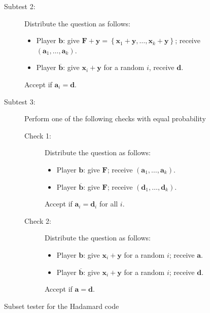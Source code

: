 \documentclass[10pt,a4paper]{article}
\theoremstyle{plain}
\theoremstyle{definition}
\newcommand {\set} [1] {\ensuremath{ \left\lbrace #1 \right\rbrace }}
\newenvironment{Algorithm}{\begin{framed}}{\end{framed}}
\newcommand{\1}{\mathbb{1}} %
\newcommand{\ba}{\pmb{a}}
\newcommand{\bb}{\pmb{b}}
\newcommand{\bd}{\pmb{d}}
\newcommand{\bx}{\pmb{x}}
\newcommand{\by}{\pmb{y}}
\newcommand{\pmbF}{\pmb{F}}
\begin{document}
\begin{figure}
\begin{Algorithm}
\begin{description}
    \item[Subtest 2:]
    Distribute the question as follows:
        \begin{itemize}
            \item Player $\bb$: give $\pmbF+\by = \set{\bx_1+\by, \ldots, \bx_k+\by}$; receive $(\ba_1, \ldots, \ba_k)$.
            \item Player $\overline{\bb}$: give $\bx_i + \by$ for a random $i$, receive $\bd$.
        \end{itemize}
        Accept if $\ba_i = \bd$.
	\item[Subtest 3:] Perform one of the following checks with equal probability
    \begin{description}
        \item[Check 1:] Distribute the question as follows:
        \begin{itemize}
            \item Player $\bb$: give $\pmbF$; receive $(\ba_1, \ldots, \ba_k)$.
            \item Player $\overline{\bb}$: give $\pmbF$; receive $(\bd_1, \ldots, \bd_k)$.
        \end{itemize}
        Accept if $\ba_i = \bd_i$ for all $i$.
        \item[Check 2:] Distribute the question as follows:
        \begin{itemize}
            \item Player $\bb$: give $\bx_i+\by$ for a random $i$; receive $\ba$.
            \item Player $\overline{\bb}$: give $\bx_i+\by$ for a random $i$; receive $\bd$.
        \end{itemize}
        Accept if $\ba = \bd$.
    \end{description}
\end{description}
\end{Algorithm}
\caption{Subset tester for the Hadamard code}
    \label{fig:hadamardcode}
\end{figure}
\end{document}

